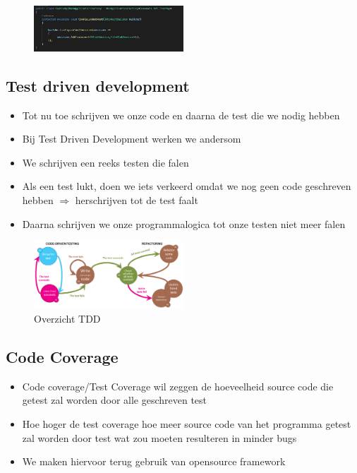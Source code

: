 \documentclass{article}
\begin{document}
\begin{figure}[H]
    \centering
    \includegraphics[width=0.5\textwidth]{integration-test5.png}
\end{figure}

\subsection{Test driven development}

\begin{itemize}
    \item Tot nu toe schrijven we onze code en daarna de test die we nodig hebben
    \item Bij Test Driven Development werken we andersom
    \item We schrijven een reeks testen die falen
    \item Als een test lukt, doen we iets verkeerd omdat we nog geen code geschreven hebben $\Rightarrow$ herschrijven tot de test faalt
    \item Daarna schrijven we onze programmalogica tot onze testen niet meer falen
\end{itemize}

\begin{figure}[H]
    \centering
    \includegraphics[width=0.5\textwidth]{test-driven-development.png}
    \caption{Overzicht TDD}
\end{figure}

\subsection{Code Coverage}

\begin{itemize}
    \item Code coverage/Test Coverage wil zeggen de hoeveelheid source code die getest zal worden door alle geschreven test
    \item Hoe hoger de test coverage hoe meer source code van het programma getest zal worden door test wat zou moeten resulteren in minder bugs
    \item We maken hiervoor terug gebruik van opensource framework
\end{itemize}
\end{document}
